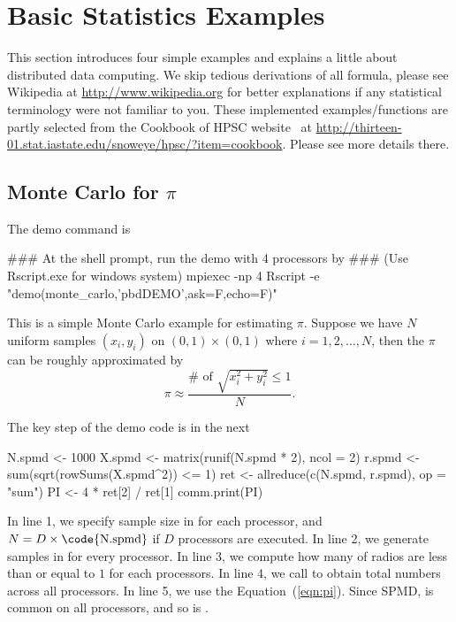 
\section[Basic Statistics Examples]{Basic Statistics Examples}
\label{sec:statistics_examples}

This section introduces four simple examples and explains a little about
distributed data computing. We skip tedious derivations of all formula,
please see Wikipedia at \url{http://www.wikipedia.org} for better
explanations if any statistical terminology were not familiar to you.
These implemented examples/functions are partly
selected from the Cookbook of HPSC website~\citep{hpsc2011} at
\url{http://thirteen-01.stat.iastate.edu/snoweye/hpsc/?item=cookbook}.
Please see more details there.




\subsection[Monte Carlo for $\pi$]{Monte Carlo for $\pi$}
\label{sec:monte_carlo}

The demo command is
\begin{Command}
### At the shell prompt, run the demo with 4 processors by
### (Use Rscript.exe for windows system)
mpiexec -np 4 Rscript -e "demo(monte_carlo,'pbdDEMO',ask=F,echo=F)"
\end{Command}

This is a simple Monte Carlo example for estimating $\pi$.
Suppose we have $N$ uniform samples $(x_i, y_i)$ on $(0, 1)\times (0,1)$
where $i = 1, 2, \ldots, N$, then
the $\pi$ can be roughly approximated by
\begin{equation}
\pi \approx \frac{\# \mbox{ of } \sqrt{x_i^2+y_i^2} \leq 1}{N}.
\label{eqn:pi}
\end{equation}

The key step of the demo code is in the next
\begin{Code}[title=R Code,numbers=left]
N.spmd <- 1000
X.spmd <- matrix(runif(N.spmd * 2), ncol = 2)
r.spmd <- sum(sqrt(rowSums(X.spmd^2)) <= 1)
ret <- allreduce(c(N.spmd, r.spmd), op = "sum")
PI <- 4 * ret[2] / ret[1]
comm.print(PI)
\end{Code}
In line 1, we specify sample size in  for each processor,
and $N=D\times\mbox{\code{N.spmd}}$ if $D$ processors are executed.
In line 2, we generate samples in  for every processor.
In line 3, we compute how many of radios are less than or equal to $1$
for each processors.
In line 4, we call  to obtain total numbers across all
processors.
In line 5, we use the Equation~(\ref{eqn:pi}).
Since SPMD,  is common on all processors, and so is .




